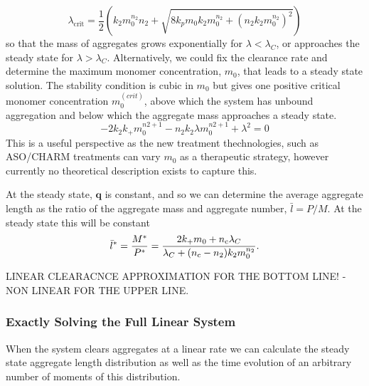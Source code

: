 \begin{equation}
    \lambda_{\text{crit}} = \frac{1}{2} \left(k_2 m_0^{n_2} n_2 + \sqrt{8 k_p m_0 k_2 m_0^{n_2} + \left(n_2 k_2 m_0^{n_2}\right)^2}\right)
\end{equation}
 so that the mass of aggregates grows exponentially for $\lambda<\lambda_C$, or approaches the steady state for $\lambda>\lambda_C$. Alternatively, we could fix the clearance rate and determine the maximum monomer concentration, $m_0$, that leads to a steady state solution. The stability condition is cubic in $m_0$ but  gives one positive critical monomer concentration $m_0^{(crit)}$, above which the system has unbound aggregation and below which the aggregate mass approaches a steady state.
\begin{equation}
    -2 k_2 k_+ m_0^{n2+1} - n_2 k_2 \lambda m_0^{n2+1} +\lambda^2 = 0
\end{equation}
This is a useful perspective as the new treatment thechnologies, such as ASO/CHARM treatments can vary $m_0$ as a therapeutic strategy, however currently no theoretical description exists to capture this.

At the steady state, $\textbf{q}$ is constant, and so we can determine the average aggregate length as the ratio of the aggregate mass and aggregate number, $\bar{l}=P/M$. At the steady state this will be constant
\begin{equation}
    \bar{l}^* = \frac{M^*}{P^*} = \frac{2 k_+ m_0 + n_{\mathrm{c}} \lambda_C}{\lambda_C+(n_{\mathrm{c}}-n_2)k_2 m_0^{n_2}}.
    \label{eq:lbarConstClear}
\end{equation}

LINEAR CLEARACNCE APPROXIMATION FOR THE BOTTOM LINE! - NON LINEAR FOR THE UPPER LINE.
\subsubsection{Exactly Solving the Full Linear System}

When the system clears aggregates at a linear rate we can calculate the steady state aggregate length distribution as well as the time evolution of an arbitrary number of moments of this distribution.


